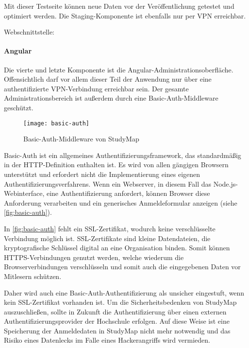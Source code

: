 Mit dieser Testseite können neue Daten vor der Veröffentlichung getestet und optimiert werden. Die Staging-Komponente ist ebenfalls nur per VPN erreichbar.

\noindent
Webschnittstelle: 

\paragraph*{Angular}\label{paragraph:angular-basic-auth}
Die vierte und letzte Komponente ist die Angular-Administrationsoberfläche. Offensichtlich darf vor allem dieser Teil der Anwendung nur über eine authentifizierte VPN-Verbindung erreichbar sein. Der gesamte Administrationsbereich ist außerdem durch eine Basic-Auth-Middleware geschützt.

\begin{figure}[H]
    \centering
    \texttt{[image: basic-auth]}
    \caption{Basic-Auth-Middleware von StudyMap}
    \label{fig:basic-auth}
\end{figure}

Basic-Auth ist ein allgemeines Authentifizierungsframework, das standardmäßig in der HTTP-Definition enthalten ist. \parencite{mozilla_corporation_http_2023} Es wird von allen gängigen Browsern unterstützt und erfordert nicht die Implementierung eines eigenen Authentifizierungsverfahrens. \parencite{fyrd_headers_2024} Wenn ein Webserver, in diesem Fall das Node.js-Webinterface, eine Authentifizierung anfordert, können Browser diese Anforderung verarbeiten und ein generisches Anmeldeformular anzeigen (siehe \autoref{fig:basic-auth}).

In \autoref{fig:basic-auth} fehlt ein SSL-Zertifikat, wodurch keine verschlüsselte Verbindung möglich ist. SSL-Zertifikate sind kleine Datendateien, die kryptografische Schlüssel digital an eine Organisation binden. Somit können HTTPS-Verbindungen genutzt werden, welche wiederum die Browserverbindungen verschlüsseln und somit auch die eingegebenen Daten vor Mitlesern schützen. \parencite{globalsign_was_2023}

Daher wird auch eine Basic-Auth-Authentifizierung als unsicher eingestuft, wenn kein SSL-Zertifikat vorhanden ist. Um die Sicherheitsbedenken von StudyMap auszuschließen, sollte in Zukunft die Authentifizierung über einen externen Authentifizierungsprovider der Hochschule erfolgen. Auf diese Weise ist eine Speicherung der Anmeldedaten in StudyMap nicht mehr notwendig und das Risiko eines Datenlecks im Falle eines Hackerangriffs wird vermieden.

